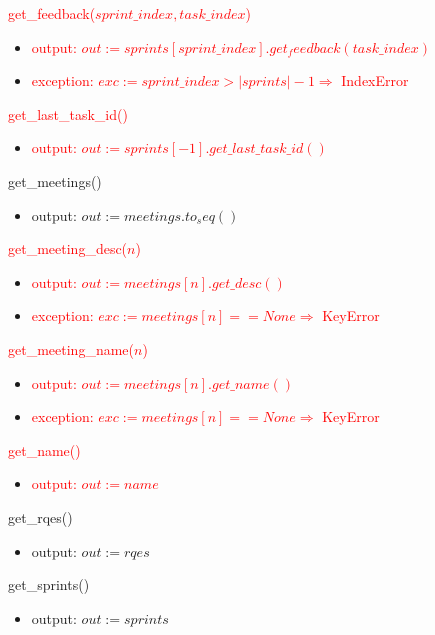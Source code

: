 \documentclass[12pt, titlepage]{article}
\begin{document}
\noindent \textcolor{red}{get\_feedback($sprint\_index, task\_index$)}
\begin{itemize}
    \item \textcolor{red}{output: $out := sprints[sprint\_index].get_feedback(task\_index)$}
    \item \textcolor{red}{exception: $exc := sprint\_index > |sprints| - 1 \Rightarrow$ IndexError}
\end{itemize}

\noindent \textcolor{red}{get\_last\_task\_id()}
\begin{itemize}
    \item \textcolor{red}{output: $out := sprints[-1].get\_last\_task\_id()$}
\end{itemize}

\noindent get\_meetings()
\begin{itemize}
    \item output: $out := meetings.to_seq()$
\end{itemize}

\noindent \textcolor{red}{get\_meeting\_desc($n$)}
\begin{itemize}
    \item \textcolor{red}{output: $out := meetings[n].get\_desc()$}
    \item \textcolor{red}{exception: $exc := meetings[n] == None \Rightarrow$ KeyError}
\end{itemize}

\noindent \textcolor{red}{get\_meeting\_name($n$)}
\begin{itemize}
    \item \textcolor{red}{output: $out := meetings[n].get\_name()$}
    \item \textcolor{red}{exception: $exc := meetings[n] == None \Rightarrow$ KeyError}
\end{itemize}

\noindent \textcolor{red}{get\_name()}
\begin{itemize}
    \item \textcolor{red}{output: $out := name$}
\end{itemize}

\noindent get\_rqes()
\begin{itemize}
    \item output: $out := rqes$
\end{itemize}

\noindent get\_sprints()
\begin{itemize}
    \item output: $out := sprints$
\end{itemize}
\end{document}
